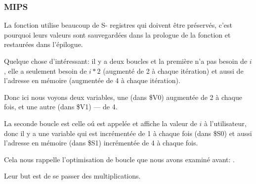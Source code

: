 ﻿\subsubsection{MIPS}

La fonction utilise beaucoup de S- registres qui doivent être préservés, c'est pourquoi
leurs valeurs sont sauvegardées dans la prologue de la fonction et restaurées dans
l'épilogue.



Quelque chose d'intéressant: il y a deux boucles et la première n'a pas besoin de
$i$, elle a seulement besoin de $i*2$ (augmenté de 2 à chaque itération) et aussi
de l'adresse en mémoire (augmentée de 4 à chaque itération).

Donc ici nous voyons deux variables, une (dans \$V0) augmentée de 2 à chaque fois,
et une autre (dans \$V1) --- de 4.

La seconde boucle est celle oú \printf est appelée et affiche la valeur de $i$ à
l'utilisateur, donc il y a une variable qui est incrémentée de 1 à chaque fois (dans
\$S0) et aussi l'adresse en mémoire (dans \$S1) incrémentée de 4 à chaque fois.

Cela nous rappelle l'optimisation de boucle que nous avons examiné avant: .

Leur but est de se passer des multiplications.

